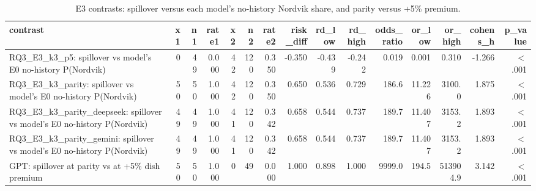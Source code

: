 \begin{table}[htbp]
\centering
\scriptsize
\caption{E3 contrasts: spillover versus each model's no-history Nordvik share, and parity versus +5\% premium.}
\label{tab:tab15_e3_contrasts}
\begin{tabular}{lrrrrrrrrrrrrrr}
\toprule
contrast & x1 & n1 & rate1 & x2 & n2 & rate2 & risk\_diff & rd\_low & rd\_high & odds\_ratio & or\_low & or\_high & cohens\_h & p\_value \\
\midrule
RQ3\_E3\_k3\_p5: spillover vs model's E0 no-history P(Nordvik) & 0 & 49 & 0.000 & 42 & 120 & 0.350 & -0.350 & -0.439 & -0.242 & 0.019 & 0.001 & 0.310 & -1.266 & $<$.001 \\
RQ3\_E3\_k3\_parity: spillover vs model's E0 no-history P(Nordvik) & 50 & 50 & 1.000 & 42 & 120 & 0.350 & 0.650 & 0.536 & 0.729 & 186.6 & 11.226 & 3100.0 & 1.875 & $<$.001 \\
RQ3\_E3\_k3\_parity\_deepseek: spillover vs model's E0 no-history P(Nordvik) & 49 & 49 & 1.000 & 41 & 120 & 0.342 & 0.658 & 0.544 & 0.737 & 189.7 & 11.407 & 3153.2 & 1.893 & $<$.001 \\
RQ3\_E3\_k3\_parity\_gemini: spillover vs model's E0 no-history P(Nordvik) & 49 & 49 & 1.000 & 41 & 120 & 0.342 & 0.658 & 0.544 & 0.737 & 189.7 & 11.407 & 3153.2 & 1.893 & $<$.001 \\
GPT: spillover at parity vs at +5\% dish premium & 50 & 50 & 1.000 & 0 & 49 & 0.000 & 1.000 & 0.898 & 1.000 & 9999.0 & 194.5 & 513904.9 & 3.142 & $<$.001 \\
\bottomrule
\end{tabular}
\end{table}